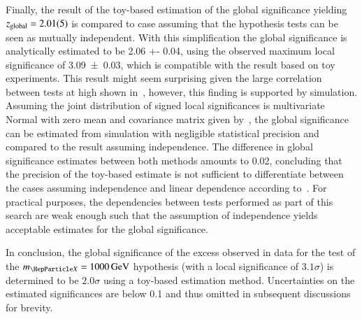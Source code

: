 Finally, the result of the toy-based estimation of the global significance
yielding $z_{\text{global}} = \num{2.01 +- 0.05}$ is compared to case assuming
that the hypothesis tests can be seen as mutually independent. With this
simplification the global significance is analytically estimated to be \num{2.06
  +- 0.04}, using the observed maximum local significance of \num{3.09 +- 0.03},
which is compatible with the result based on toy experiments. This result might
seem surprising given the large correlation between tests at high \mX shown
in~, however, this finding is supported by
simulation. Assuming the joint distribution of signed local significances is
multivariate Normal with zero mean and covariance matrix given
by~, the global significance can be estimated from simulation
with negligible statistical precision and compared to the result assuming
independence. The difference in global significance estimates between both
methods amounts to \num{0.02}, concluding that the precision of the toy-based
estimate is not sufficient to differentiate between the cases assuming
independence and linear dependence according to~. For
practical purposes, the dependencies between tests performed as part of this
search are weak enough such that the assumption of independence yields
acceptable estimates for the global significance.

In conclusion, the global significance of the excess observed in data for the
test of the $\mX = \SI{1000}{\GeV}$ hypothesis (with a local significance of
$3.1\sigma$) is determined to be $2.0\sigma$ using a toy-based estimation
method. Uncertainties on the estimated significances are below \num{0.1} and
thus omitted in subsequent discussions for brevity.


